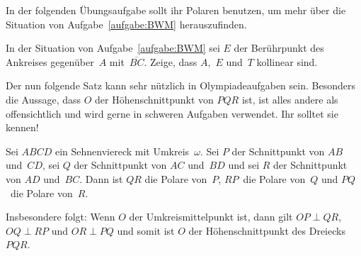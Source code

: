 In der folgenden Übungsaufgabe sollt ihr Polaren benutzen, um mehr über die Situation von Aufgabe~\ref{aufgabe:BWM} herauszufinden.

\begin{aufgabe*}\label{aufgabe:BWM2}
	In der Situation von Aufgabe~\ref{aufgabe:BWM} sei $E$ der Berührpunkt des Ankreises gegenüber~$A$ mit~$\overline{BC}$. Zeige, dass $A$,~$E$ und~$T$ kollinear sind.
\end{aufgabe*}

Der nun folgende Satz kann sehr nützlich in Olympiadeaufgaben sein. Besonders die Aussage, dass $O$ der Höhenschnittpunkt von $PQR$ ist, ist alles andere als offensichtlich und wird gerne in schweren Aufgaben verwendet. Ihr solltet sie kennen!

\begin{satzmitnamen}
	Sei $ABCD$ ein Sehnenviereck mit Umkreis~$\omega$. Sei $P$ der Schnittpunkt von $AB$ und~$CD$, sei $Q$ der Schnittpunkt von $AC$ und~$BD$ und sei $R$ der Schnittpunkt von $AD$ und~$BC$. Dann ist $QR$ die Polare von~$P$, $RP$~die Polare von~$Q$ und $PQ$~die Polare von~$R$.
	
	Insbesondere folgt: Wenn $O$ der Umkreismittelpunkt ist, dann gilt $OP\perp QR$, $OQ\perp RP$ und $OR\perp PQ$ und somit ist $O$ der Höhenschnittpunkt des Dreiecks $PQR$.
\end{satzmitnamen}

